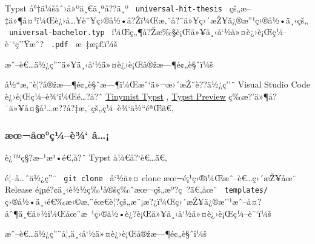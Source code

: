 Typst å°†ä¼šåˆ›å»ºä¸€ä¸ªå??ä¸º \texttt{\ universal-hit-thesis\ }
çš„æ--‡ä»¶å¤¹ï¼Œè¿›å\ldots¥è¯¥ç›®å½•å?Žï¼Œæ‚¨å?¯ä»¥ç›´æŽ¥ä¿®æ''¹ç›®å½•ä¸‹çš„
\texttt{\ universal-bachelor.typ\ }
ï¼Œç„¶å?Žæ‰§è¡Œä»¥ä¸‹å`½ä»¤è¿›è¡Œç¼--è¯`ç''Ÿæˆ? \texttt{\ .pdf\ }
æ--‡æ¡£ï¼š

\begin{Shaded}
\begin{Highlighting}[]
\end{Highlighting}
\end{Shaded}

æˆ--è€\ldots ä½¿ç''¨ä»¥ä¸‹å`½ä»¤è¿›è¡Œå®žæ---¶é¢„è§ˆï¼š

\begin{Shaded}
\begin{Highlighting}[]
\end{Highlighting}
\end{Shaded}

å½``æ‚¨è¦?å®žæ---¶é¢„è§ˆæ---¶ï¼Œæˆ`ä»¬æ›´æŽ¨è??ä½¿ç''¨ Visual Studio
Code è¿›è¡Œç¼--è¾`ï¼Œé\ldots?å?ˆ
\href{https://marketplace.visualstudio.com/items?itemName=nvarner.typst-lsp}{Tinymist
Typst} ,
\href{https://marketplace.visualstudio.com/items?itemName=mgt19937.typst-preview}{Typst
Preview} ç­‰æ?'ä»¶å?¯ä»¥å¤§å¹\ldots æ??å?‡æ‚¨çš„ç¼--è¾`ä½``éªŒã€‚

\subsubsection{æœ¬åœ°ç¼--è¾`
â\ldots¡}\label{uxe6ux153uxe5ux153uxe7uxbcuxe8uxbe-uxe2}

è¿™ç§?æ--¹æ³•é€‚å?ˆ Typst å¼€å?{}`è€\ldots ã€‚

é¦--å\ldots ˆä½¿ç''¨ \texttt{\ git\ clone\ } å`½ä»¤ clone
æœ¬é¡¹ç›®ï¼Œæˆ--è€\ldots ç›´æŽ¥åœ¨ Release
é¡µé?¢ä¸‹è½½ç‰¹å®šç‰ˆæœ¬çš„æº?ç~?ã€‚åœ¨ \texttt{\ templates/\ }
ç›®å½•ä¸‹é€‰æ‹©æ‚¨éœ€è¦?çš„æ¨¡æ?¿ï¼Œç›´æŽ¥ä¿®æ''¹æˆ--å¤?åˆ¶ä¸€ä»½ï¼Œåœ¨æ~¹ç›®å½•è¿?è¡Œä»¥ä¸‹å`½ä»¤è¿›è¡Œç¼--è¯`ï¼š

\begin{Shaded}
\begin{Highlighting}[]
\end{Highlighting}
\end{Shaded}

æˆ--è€\ldots ä½¿ç''¨å¦‚ä¸‹å`½ä»¤è¿›è¡Œå®žæ---¶é¢„è§ˆï¼š


